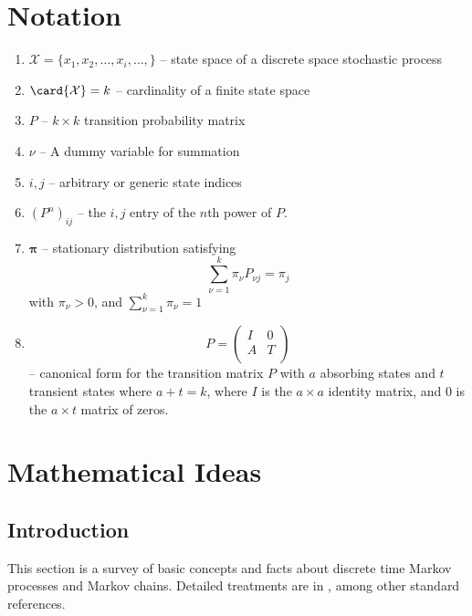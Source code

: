 \documentclass[12pt]{article}
\begin{document}
\hr

\section*{Notation}
\begin{enumerate}
    \item
        \( \mathcal{X}=\{x_1,x_2,\ldots,x_i, \ldots, \} \) -- state
        space of a discrete space stochastic process
    \item
        \( \card{\mathcal{X}} = k \) -- cardinality of a finite state
        space
    \item
        \( P \) -- \( k \times k \) transition probability matrix
    \item
        \( \nu \) -- A dummy variable for summation
    \item
        \( i, j \) -- arbitrary or generic state indices
    \item
        \( (P^n)_{ij} \) -- the \( i,j \) entry of the \( n \)th power
        of \( P \).
    \item
        \( \mathbf{\pi} \) -- stationary distribution satisfying
        \[
            \sum\limits_{\nu=1}^k \pi_\nu P_{\nu j} = \pi_j
        \] with \( \pi_\nu > 0 \), and \( \sum_{\nu=1}^k \pi_\nu = 1 \)
    \item
        \[
            P=
            \begin{pmatrix}
                I & 0 \\
                A & T \\
            \end{pmatrix}
        \] -- canonical form for the transition matrix \( P \) with \( a
        \) absorbing states and \( t \) transient states where \( a + t
        = k \), where \( I \) is the \( a\times a \) identity matrix,
        and \( 0 \) is the \( a\times t \) matrix of zeros.
\end{enumerate}

\section*{Mathematical Ideas}

\subsection*{Introduction}

This section is a survey of basic concepts and facts about discrete
time Markov
processes and Markov chains.  Detailed treatments are in
\cite{durrett09, grinstead97, karlin75, kemeny74, kemeny60, levin09,
ross06, stirzaker05-stoch-proces-model}, among other standard
references.
\end{document}
